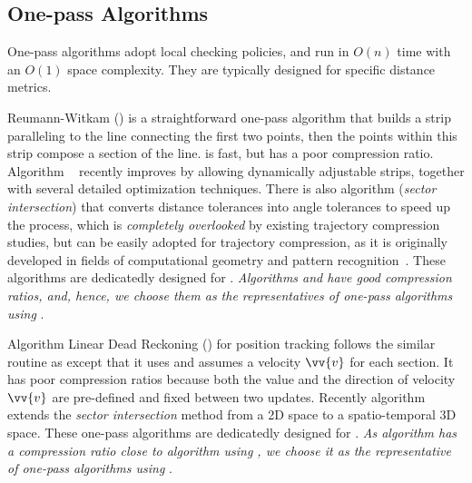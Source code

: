 \subsection{One-pass Algorithms}

One-pass algorithms adopt local checking policies, and run in $O(n)$ time with an $O(1)$ space complexity. They are typically designed for specific distance metrics.

Reumann-Witkam (\rwa) \cite{Reumann:Strip} is a straightforward one-pass algorithm that builds a strip paralleling to the line connecting the first two points, then the points within this strip compose a section of the line.  \rwa is fast, but has a poor compression ratio.
Algorithm \operb~\cite{Lin:Operb} recently improves \rwa  by allowing dynamically adjustable strips, together with several detailed optimization techniques.
%
There is also algorithm \siped (\emph{sector intersection}) that converts \ped distance tolerances into angle tolerances to speed up the process, which is {\em completely overlooked} by existing trajectory compression studies,  but can be easily adopted for trajectory compression, as it is originally developed in fields of computational geometry and pattern recognition~\cite{Williams:Longest,Sklansky:Cone,Dunham:Cone, Zhao:Sleeve}.
%
These algorithms are dedicatedly designed  for \ped. {\em Algorithms \operb and \siped have good compression ratios, and, hence, we choose them as the representatives of  one-pass algorithms using \ped}.


Algorithm Linear Dead Reckoning (\ldr) for position tracking \cite{Lange:Tracking,Trajcevski:DDR} follows the similar routine as \rwa except that it uses \sed and assumes a velocity ${\vv{v}}$ for each section.
It has poor compression ratios because both the value and the direction of velocity ${\vv{v}}$ are pre-defined and fixed between two updates.
Recently algorithm \cised~\cite{Lin:Cised} extends the \textit{sector intersection} method \siped from a 2D space to a spatio-temporal 3D space.
These one-pass algorithms are dedicatedly designed for \sed. {\em As algorithm \cised has a compression ratio close to algorithm \dpa using \sed, we choose it as the representative of one-pass algorithms using \sed}.


